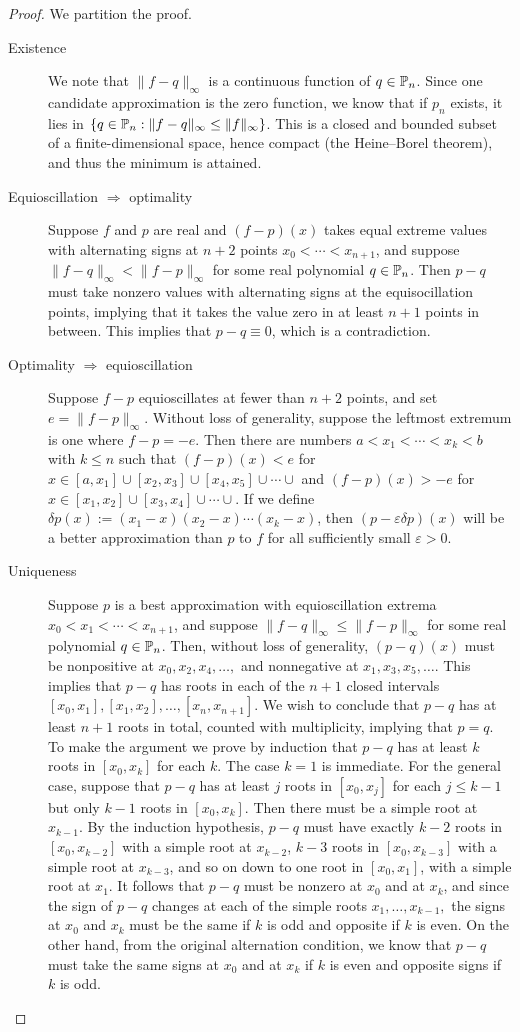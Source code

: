 \begin{proof}
We partition the proof.
\begin{description}
\item[Existence] We note that $\|f-q\|_\infty$ is a continuous function of $q\in\P_n$. Since one candidate approximation is the zero function, we know that if $p_n$ exists, it lies in $\{q\in\P_n : \|f-q\|_\infty \le \|f\|_\infty\}$. This is a closed and bounded subset of a finite-dimensional space, hence compact (the Heine--Borel theorem), and thus the minimum is attained.
\item[Equioscillation $\Longrightarrow$ optimality] Suppose $f$ and $p$ are real and $(f-p)(x)$ takes equal extreme values with alternating signs at $n+2$ points $x_0<\cdots<x_{n+1}$, and suppose $\|f-q\|_\infty < \|f-p\|_\infty$ for some real polynomial $q\in\P_n$. Then $p-q$ must take nonzero values with alternating signs at the equisocillation points, implying that it takes the value zero in at least $n+1$ points in between. This implies that $p-q\equiv0$, which is a contradiction.
\item[Optimality $\Longrightarrow$ equioscillation] Suppose $f-p$ equioscillates at fewer than $n+2$ points, and set $e = \|f-p\|_\infty$. Without loss of generality, suppose the leftmost extremum is one where $f-p = -e$. Then there are numbers $a < x_1 < \cdots < x_k < b$ with $k\le n$ such that $(f-p)(x) < e$ for $x\in[a,x_1]\cup[x_2,x_3]\cup[x_4,x_5]\cup\cdots\cup$ and $(f-p)(x)>-e$ for $x\in[x_1,x_2]\cup[x_3,x_4]\cup\cdots\cup$. If we define $\delta p(x) := (x_1-x)(x_2-x)\cdots(x_k-x)$, then $(p-\varepsilon\delta p)(x)$ will be a better approximation than $p$ to $f$ for all sufficiently small $\varepsilon>0$.
\item[Uniqueness] Suppose $p$ is a best approximation with equioscillation extrema $x_0<x_1<\cdots<x_{n+1}$, and suppose $\|f-q\|_\infty \le \|f-p\|_\infty$ for some real polynomial $q\in\P_n$. Then, without loss of generality, $(p-q)(x)$ must be nonpositive at $x_0,x_2,x_4,\ldots,$ and nonnegative at $x_1,x_3,x_5,\ldots.$ This implies that $p-q$ has roots in each of the $n+1$ closed intervals $[x_0,x_1], [x_1,x_2],\ldots,[x_n,x_{n+1}]$. We wish to conclude that $p-q$ has at least $n+1$ roots in total, counted with multiplicity, implying that $p=q$. To make the argument we prove by induction that $p-q$ has at least $k$ roots in $[x_0,x_k]$ for each $k$. The case $k=1$ is immediate. For the general case, suppose that $p-q$ has at least $j$ roots in $[x_0,x_j]$ for each $j\le k-1$ but only $k-1$ roots in $[x_0,x_k]$. Then there must be a simple root at $x_{k-1}$. By the induction hypothesis, $p-q$ must have exactly $k-2$ roots in $[x_0,x_{k-2}]$ with a simple root at $x_{k-2}$, $k-3$ roots in $[x_0,x_{k-3}]$ with a simple root at $x_{k-3}$, and so on down to one root in $[x_0,x_1]$, with a simple root at $x_1$. It follows that $p-q$ must be nonzero at $x_0$ and at $x_k$, and since the sign of $p-q$ changes at each of the simple roots $x_1,\ldots,x_{k-1},$ the signs at $x_0$ and $x_k$ must be the same if $k$ is odd and opposite if $k$ is even. On the other hand, from the original alternation condition, we know that $p-q$ must take the same signs at $x_0$ and at $x_k$ if $k$ is even and opposite signs if $k$ is odd.

\end{description}
\end{proof}
